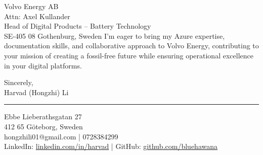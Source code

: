 \documentclass[a4paper,10pt]{article}
\begin{document}
\begin{letter}{\color{darkblue}
Volvo Energy AB\\
Attn: Axel Kullander\\
Head of Digital Products – Battery Technology\\
SE-405 08 Gothenburg, Sweden}
I'm eager to bring my Azure expertise, documentation skills, and collaborative approach to Volvo Energy, contributing to your mission of creating a fossil-free future while ensuring operational excellence in your digital platforms.

\vspace{10pt}

\closing{
Sincerely,\\
\vspace{15pt}
Harvad (Hongzhi) Li
}

\vspace{20pt}

{\color{darkblue}\rule{\linewidth}{0.6pt}}
\vspace{4pt}

{\color{darkblue}
Ebbe Lieberathsgatan 27\\
412 65 Göteborg, Sweden\\
hongzhili01@gmail.com | 0728384299\\
LinkedIn: \href{https://www.linkedin.com/in/harvad/}{linkedin.com/in/harvad} | GitHub: \href{https://github.com/bluehawana}{github.com/bluehawana}
}

\end{letter}
\end{document}
